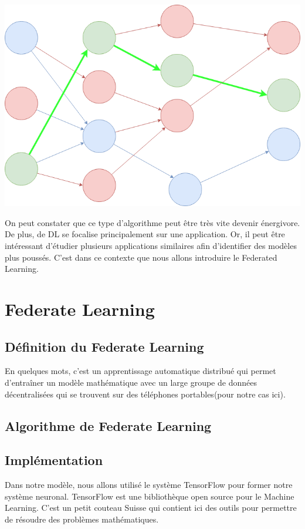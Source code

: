 \documentclass[12pt,a4paper]{report}
\begin{document}
\begin{center}
	\includegraphics[scale=0.4]{deep_learning_schema}
	\label{fig1}
\end{center}

On peut constater que ce type d'algorithme peut être très vite devenir énergivore. De plus, de DL se focalise principalement sur une application. Or, il peut être intéressant d'étudier plusieurs applications similaires afin d'identifier des modèles plus poussés. C'est dans ce contexte que nous allons introduire le Federated Learning.


\chapter{Federate Learning}
\section{Définition du Federate Learning}

En quelques mots, c'est un apprentissage automatique distribué qui permet d'entraîner un modèle mathématique avec un large groupe de données décentralisées qui se trouvent sur des téléphones portables(pour notre cas ici).


\section{Algorithme de Federate Learning}


\section{Implémentation}
Dans notre modèle, nous allons utilisé le système TensorFlow pour former notre système neuronal. TensorFlow est une bibliothèque open source pour le Machine Learning. C'est un petit couteau Suisse qui contient ici des outils pour permettre de résoudre des problèmes mathématiques. 
\end{document}
